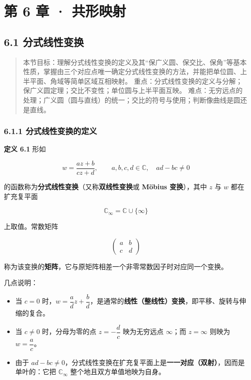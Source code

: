 \chapter{第 6 章 ·
共形映射}\label{ux7b2c-6-ux7ae0-ux5171ux5f62ux6620ux5c04}

\section{6.1 分式线性变换}\label{ux5206ux5f0fux7ebfux6027ux53d8ux6362}

\begin{quote}
本节目标：理解分式线性变换的定义及其``保广义圆、保交比、保角''等基本性质，掌握由三个对应点唯一确定分式线性变换的方法，并能把单位圆、上半平面、角域等简单区域互相映射。
重点：分式线性变换的定义与分解；保广义圆定理；交比不变性；单位圆与上半平面互映。
难点：无穷远点的处理；广义圆（圆与直线）的统一；交比的符号与使用；判断像曲线是圆还是直线。
\end{quote}

\subsection{6.1.1
分式线性变换的定义}\label{ux5206ux5f0fux7ebfux6027ux53d8ux6362ux7684ux5b9aux4e49}

\textbf{定义 6.1} 形如

\[
w = \frac{az+b}{cz+d},\qquad a,b,c,d \in \mathbb{C},\quad ad-bc \neq 0
\]

的函数称为\textbf{分式线性变换}（又称\textbf{双线性变换}或
\textbf{Möbius 变换}），其中 \(z\) 与 \(w\) 都在扩充复平面

\[
\mathbb{C}_{\infty} = \mathbb{C}\cup\{\infty\}
\]

上取值。常数矩阵

\[
\begin{pmatrix} a & b \\ c & d \end{pmatrix}
\]

称为该变换的\textbf{矩阵}，它与原矩阵相差一个非零常数因子时对应同一个变换。

几点说明：

\begin{itemize}
\tightlist
\item
  当 \(c=0\)
  时，\(w=\dfrac{a}{d}z+\dfrac{b}{d}\)，是通常的\textbf{线性（整线性）变换}，即平移、旋转与伸缩的复合。
\item
  当 \(c\neq 0\) 时，分母为零的点 \(z=-\dfrac{d}{c}\) 映为无穷远点
  \(\infty\)；而 \(z=\infty\) 则映为 \(w=\dfrac{a}{c}\)。
\item
  由于
  \(ad-bc\neq 0\)，分式线性变换在扩充复平面上是\textbf{一一对应（双射）}，因而是单叶的：它把
  \(\mathbb{C}_{\infty}\) 整个地且双方单值地映为自身。
\end{itemize}

